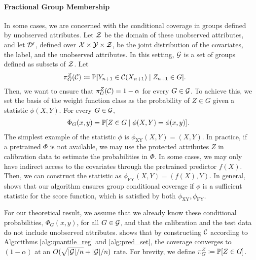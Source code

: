 \paragraph{Fractional Group Membership}
In some cases, we are concerned with the conditional coverage in groups defined by unobserved attributes. Let ${\cal Z}$ be the domain of these unobserved attributes, and let ${\cal D}'$, defined over ${\cal X}\times {\cal Y} \times {\cal Z} $, be the joint distribution of the covariates, the label, and the unobserved attributes. In this setting, ${\cal G}$ is a set of groups defined as subsets of ${\cal Z}$. Let 
\begin{align*}
    &\pi^Z_{G}({\cal C}) \coloneqq \mathbb{P} [ Y_{n+1} \in {\cal C}(X_{n+1}) \mid Z_{n+1} \in G].
\end{align*}
Then, we want to ensure that $\pi^Z_G({\cal C}) = 1-\alpha$ for every $G \in {\cal G}$. To achieve this, we set the basis of the weight function class as the probability of $Z\in G$ given a statistic $\phi(X,Y)$. For every $G \in {\cal G}$,
\begin{align}
\label{eq:Phi_XY}
    \Phi_G(x,y) = \mathbb{P}[Z \in G \mid \phi(X,Y)=\phi(x,y)].
\end{align}
The simplest example of the statistic $\phi$ is $\phi_{\text{XY}}(X,Y) = (X,Y)$. In practice, if a pretrained $\Phi$ is not available, we may use the protected attributes $Z$ in calibration data to estimate the probabilities in $\Phi$. In some cases, we may only have indirect access to the covariates through the pretrained predictor $f(X)$. Then, we can construct the statistic as $\phi_{\text{FY}}(X,Y) = (f(X), Y)$. In general,  shows that our algorithm ensures group conditional coverage if $\phi$ is a sufficient statistic for the score function, which is satisfied by both $\phi_{\text{XY}},\phi_{\text{FY}}$.

 For our theoretical result, we assume that we already know these conditional probabilities, $\Phi_G(x,y)$, for all $G \in {\cal G}$, and that the calibration and the test data %
 do not include unobserved attributes.  shows that by constructing 
 ${\cal C}$ according to Algorithms \ref{alg:quantile_reg} and \ref{alg:pred_set}, the coverage converges to $(1-\alpha)$ at an $O(\sqrt{|{\cal G}|/n}+|{\cal G}|/n)$ rate. For brevity, we define $\pi_G^Z \coloneqq \mathbb{P}[Z \in G]$. 
 
